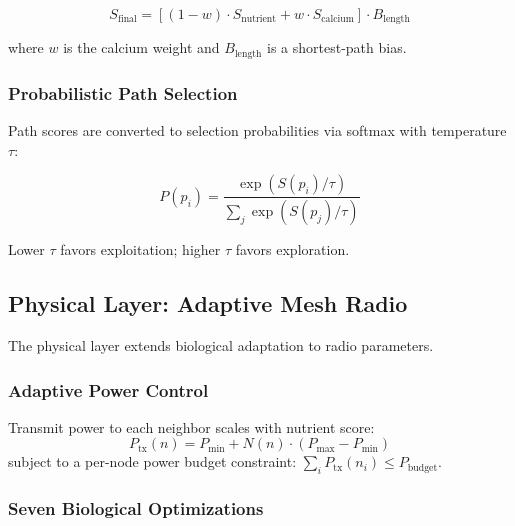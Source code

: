 \documentclass[conference,10pt]{IEEEtran}
\begin{document}
\begin{equation}
    S_{\text{final}} = \left[(1-w) \cdot S_{\text{nutrient}} + w \cdot S_{\text{calcium}}\right] \cdot B_{\text{length}}
    \label{eq:blend}
\end{equation}

where $w$ is the calcium weight and $B_{\text{length}}$ is a shortest-path bias.

\subsubsection{Probabilistic Path Selection}

Path scores are converted to selection probabilities via softmax with temperature $\tau$:

\begin{equation}
    P(p_i) = \frac{\exp(S(p_i)/\tau)}{\sum_j \exp(S(p_j)/\tau)}
\end{equation}

Lower $\tau$ favors exploitation; higher $\tau$ favors exploration.

\subsection{Physical Layer: Adaptive Mesh Radio}

The physical layer extends biological adaptation to radio parameters.

\subsubsection{Adaptive Power Control}

Transmit power to each neighbor scales with nutrient score:
\begin{equation}
    P_{\text{tx}}(n) = P_{\min} + N(n) \cdot (P_{\max} - P_{\min})
\end{equation}
subject to a per-node power budget constraint: $\sum_i P_{\text{tx}}(n_i) \leq P_{\text{budget}}$.

\subsubsection{Seven Biological Optimizations}
\end{document}
